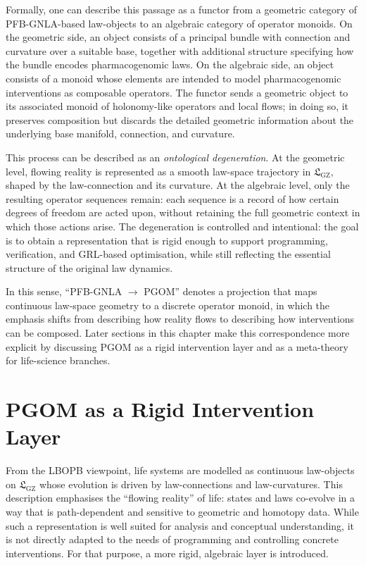 \documentclass[11pt]{book}
\theoremstyle{plain}
\theoremstyle{definition}
\theoremstyle{remark}
\newcommand{\GZLS}{\ensuremath{\mathfrak{L}_{\mathrm{GZ}}}}       \newcommand{\GZLT}{\ensuremath{M_{!w}}}                           \newcommand{\GZLOC}{\ensuremath{A_M}}                             \newcommand{\GZLCurv}{\ensuremath{\mathcal{F}_{\mathrm{law}}}}
\begin{document}
Formally, one can describe this passage as a functor from a geometric
category of PFB-GNLA-based law-objects to an algebraic category of
operator monoids. On the geometric side, an object consists of a
principal bundle with connection and curvature over a suitable base,
together with additional structure specifying how the bundle encodes
pharmacogenomic laws. On the algebraic side, an object consists of a
monoid whose elements are intended to model pharmacogenomic
interventions as composable operators. The functor sends a geometric
object to its associated monoid of holonomy-like operators and local
flows; in doing so, it preserves composition but discards the detailed
geometric information about the underlying base manifold, connection,
and curvature.

This process can be described as an \emph{ontological degeneration}.
At the geometric level, flowing reality is represented as a smooth
law-space trajectory in $\GZLS$, shaped by the law-connection and its
curvature. At the algebraic level, only the resulting operator
sequences remain: each sequence is a record of how certain degrees of
freedom are acted upon, without retaining the full geometric context
in which those actions arise. The degeneration is controlled and
intentional: the goal is to obtain a representation that is rigid
enough to support programming, verification, and GRL-based optimisation,
while still reflecting the essential structure of the original law
dynamics.

In this sense, ``PFB-GNLA $\to$ PGOM'' denotes a projection that
maps continuous law-space geometry to a discrete operator monoid, in
which the emphasis shifts from describing how reality flows to
describing how interventions can be composed. Later sections in this
chapter make this correspondence more explicit by discussing PGOM as a
rigid intervention layer and as a meta-theory for life-science
branches.

\section{PGOM as a Rigid Intervention Layer}


From the LBOPB viewpoint, life systems are modelled as continuous
law-objects on $\GZLS$ whose evolution is driven by law-connections and
law-curvatures. This description emphasises the ``flowing reality'' of
life: states and laws co-evolve in a way that is path-dependent and
sensitive to geometric and homotopy data. While such a representation
is well suited for analysis and conceptual understanding, it is not
directly adapted to the needs of programming and controlling concrete
interventions. For that purpose, a more rigid, algebraic layer is
introduced.
\end{document}
